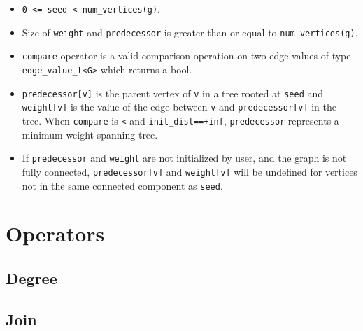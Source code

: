 \begin{itemdescr}
      \pnum\preconditions
            \begin{itemize}
                  \item
                        \lstinline{0 <= seed < num_vertices(g)}.
                  \item
                        Size of \lstinline{weight} and \lstinline{predecessor} is greater than or equal to \lstinline{num_vertices(g)}.
                  \item
                        \lstinline{compare} operator is a valid comparison operation on two edge values of type \lstinline{edge_value_t<G>} which returns a bool.
            \end{itemize}
      \pnum\effects
            \begin{itemize}
                  \item
                        \lstinline{predecessor[v]} is the parent vertex of \lstinline{v} in a tree rooted at \lstinline{seed} and \lstinline{weight[v]} is the value of the edge between \lstinline{v} and \lstinline{predecessor[v]} in the tree. When \lstinline{compare} is \lstinline{<} and \lstinline{init_dist==+inf}, \lstinline{predecessor} represents a minimum weight spanning tree.
                  \item
                        If \lstinline{predecessor} and \lstinline{weight} are not initialized by user, and the graph is not fully connected, \lstinline{predecessor[v]} and \lstinline{weight[v]} will be undefined for vertices not in the same connected component as \lstinline{seed}.
            \end{itemize}
\end{itemdescr}

\section{Operators}
\subsection{Degree}

\subsection{Join}

